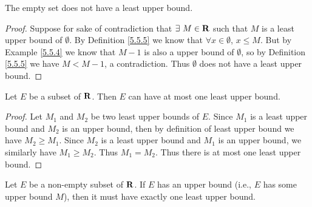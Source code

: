 \setcounter{theorem}{6}
\begin{example}\label{5.5.7}
    The empty set does not have a least upper bound.
\end{example}

\begin{proof}
    Suppose for sake of contradiction that \(\exists\ M \in \mathbf{R}\) such that \(M\) is a least upper bound of \(\emptyset\).
    By Definition \ref{5.5.5} we know that \(\forall x \in \emptyset\), \(x \leq M\).
    But by Example \ref{5.5.4} we know that \(M - 1\) is also a upper bound of \(\emptyset\), so by Definition \ref{5.5.5} we have \(M < M - 1\), a contradiction.
    Thus \(\emptyset\) does not have a least upper bound.
\end{proof}

\begin{proposition}\label{5.5.8}
    Let \(E\) be a subset of \(\mathbf{R}\).
    Then \(E\) can have at most one least upper bound.
\end{proposition}

\begin{proof}
    Let \(M_1\) and \(M_2\) be two least upper bounds of \(E\).
    Since \(M_1\) is a least upper bound and \(M_2\) is an upper bound, then by definition of least upper bound we have \(M_2 \geq M_1\).
    Since \(M_2\) is a least upper bound and \(M_1\) is an upper bound, we similarly have \(M_1 \geq M_2\).
    Thus \(M_1 = M_2\).
    Thus there is at most one least upper bound.
\end{proof}

\begin{theorem}\label{5.5.9}
    Let \(E\) be a non-empty subset of \(\mathbf{R}\).
    If \(E\) has an upper bound (i.e., \(E\) has some upper bound \(M\)), then it must have exactly one least upper bound.
\end{theorem}

